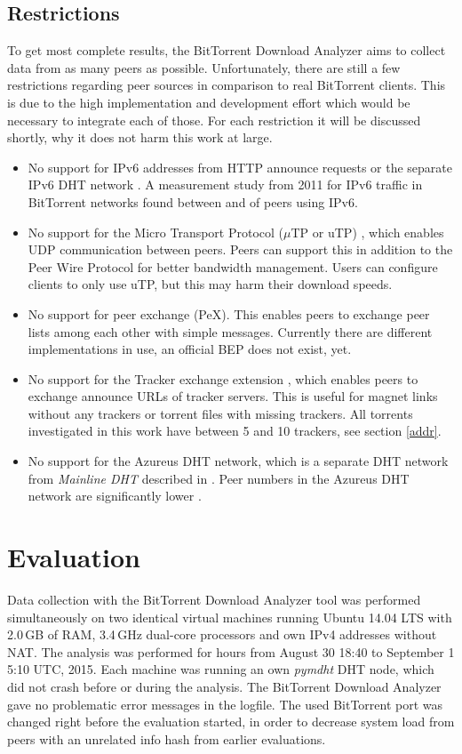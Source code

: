 \documentclass[10pt, a4paper, twoside=false, headsepline]{scrbook}
\renewcommand{\_}{\origunderscore\allowbreak}
\newcommand{\range}{from August 30 18:40 to September 1 5:10 UTC, 2015}
\begin{document}
\section{Restrictions}
\label{rest}
To get most complete results, the BitTorrent Download Analyzer aims to collect data from as many peers as possible. Unfortunately, there are still a few restrictions regarding peer sources in comparison to real BitTorrent clients. This is due to the high implementation and development effort which would be necessary to integrate each of those. For each restriction it will be discussed shortly, why it does not harm this work at large.
\begin{itemize}
\item No support for IPv6 addresses from HTTP announce requests \cite{bep7} or the separate IPv6 DHT network \cite{bep32}. A measurement study \cite[sec.~4.2.]{vyncke2012measuring} from 2011 for IPv6 traffic in BitTorrent networks found between  and  of peers using IPv6.
\item No support for the Micro Transport Protocol ($\mu$TP or uTP) \cite{bep29}, which enables UDP communication between peers. Peers can support this in addition to the Peer Wire Protocol for better bandwidth management. Users can configure clients to only use uTP, but this may harm their download speeds.
\item No support for peer exchange (PeX). This enables peers to exchange peer lists among each other with simple messages. Currently there are different implementations in use, an official BEP does not exist, yet.
\item No support for the Tracker exchange extension \cite{bep28}, which enables peers to exchange announce URLs of tracker servers. This is useful for magnet links without any trackers or torrent files with missing trackers. All torrents investigated in this work have between 5 and 10 trackers, see section \ref{addr}.
\item No support for the Azureus DHT network, which is a separate DHT network from \emph{Mainline DHT} described in \cite{bep5}. Peer numbers in the Azureus DHT network are significantly lower \cite[table~5]{drachen2011distribution}.
\end{itemize}

\chapter{Evaluation}
\label{eval}
Data collection with the BitTorrent Download Analyzer tool was performed simultaneously on two identical virtual machines running Ubuntu 14.04 LTS with 2.0\,GB of RAM, 3.4\,GHz dual-core processors and own IPv4 addresses without NAT. The analysis was performed for  hours \range. Each machine was running an own \emph{pymdht} DHT node, which did not crash before or during the analysis. The BitTorrent Download Analyzer gave no problematic error messages in the logfile. The used BitTorrent port was changed right before the evaluation started, in order to decrease system load from peers with an unrelated info hash from earlier evaluations.
\end{document}
